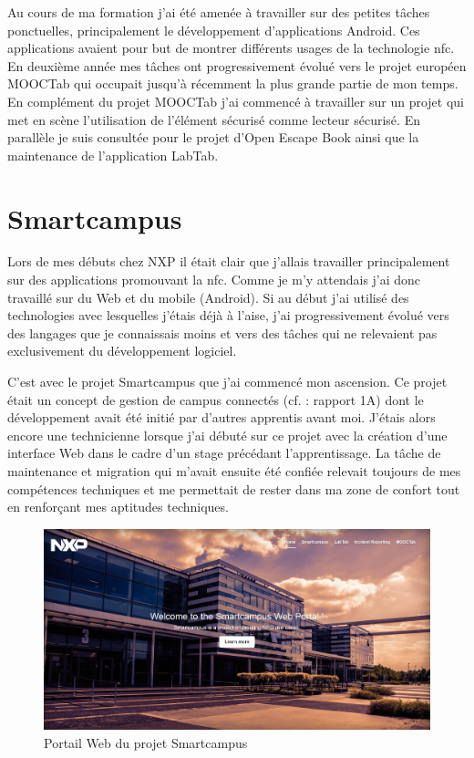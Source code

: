 \documentclass[french,12pt,a4paper,titlepage,openright,openbib]{report}
\begin{document}
Au cours de ma formation j'ai été amenée à travailler sur des petites tâches ponctuelles, principalement le développement d'applications Android. Ces applications avaient pour but de montrer différents usages de la technologie \gls{nfc}.
En deuxième année mes tâches ont progressivement évolué vers le projet européen MOOCTab qui occupait jusqu'à récemment la plus grande partie de mon temps.
En complément du projet MOOCTab j'ai commencé à travailler sur un projet qui met en scène l'utilisation de l'élément sécurisé comme lecteur sécurisé.
En parallèle je suis consultée pour le projet d'Open Escape Book ainsi que la maintenance de l'application LabTab.

\clearpage

\section{Smartcampus}

Lors de mes débuts chez NXP il était clair que j'allais travailler principalement sur des applications promouvant la \gls{nfc}. Comme je m'y attendais j'ai donc travaillé sur du Web et du mobile (Android).
Si au début j'ai utilisé des technologies avec lesquelles j'étais déjà à l'aise, j'ai progressivement évolué vers des langages que je connaissais moins et vers des tâches qui ne relevaient pas exclusivement du développement logiciel.

C'est avec le projet Smartcampus que j'ai commencé mon ascension. Ce projet était un concept de gestion de campus connectés (cf. : rapport 1A) dont le développement avait été initié par d'autres apprentis avant moi. J'étais alors encore une technicienne lorsque j'ai débuté sur ce projet avec la création d'une interface Web dans le cadre d'un stage précédant l'apprentissage.
La tâche de maintenance et migration qui m'avait ensuite été confiée relevait toujours de mes compétences techniques et me permettait de rester dans ma zone de confort tout en renforçant mes aptitudes techniques.

\begin{figure}[!htb]
	\centering
	\includegraphics[width=0.8 \textwidth]{smartcampus}
	\caption*{Portail Web du projet Smartcampus}
\end{figure}
\end{document}

